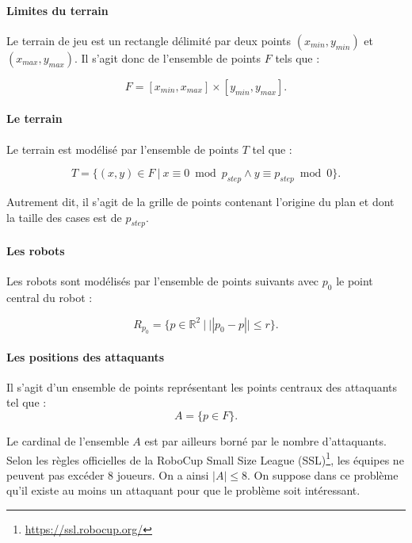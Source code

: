 \documentclass[12pt]{article}
\begin{document}
\paragraph{Limites du terrain} Le terrain de jeu est un rectangle délimité par deux points $(x_{min}, y_{min})$ et $(x_{max}, y_{max})$. Il s'agit donc de l'ensemble de points $F$ tels que :

\begin{equation*}
F = [x_{min}, x_{max}] \times [y_{min}, y_{max}].
\end{equation*}

\paragraph{Le terrain} Le terrain est modélisé par l'ensemble de points $T$ tel que :

\begin{equation*}
T = \{ (x, y) \in F \ |\  x \equiv 0 \bmod p_{step} \wedge y \equiv p_{step} \bmod 0 \}.
\end{equation*}

Autrement dit, il s'agit de la grille de points contenant l'origine du plan et dont la taille des cases est de $p_{step}$.

\paragraph{Les robots} Les robots sont modélisés par l'ensemble de points suivants avec $p_0$ le point central du robot :

\begin{equation*}
    R_{p_0} = \{ p \in \mathbb{R}^2 \ |\  ||p_0 - p|| \leqslant r \}.
\end{equation*}


\paragraph{Les positions des attaquants} Il s'agit d'un ensemble de points représentant les points centraux des attaquants tel que :
\label{section:size_team}
\begin{equation*}
    A = \{ p \in F \}.
\end{equation*}

Le cardinal de l'ensemble $A$ est par ailleurs borné par le nombre d'attaquants. Selon les règles officielles de la RoboCup Small Size League (SSL)\footnote{\url{https://ssl.robocup.org/}}, les équipes ne peuvent pas excéder 8 joueurs. On a ainsi $|A| \leqslant 8$. On suppose dans ce problème qu'il existe au moins un attaquant pour que le problème soit intéressant.
\end{document}
